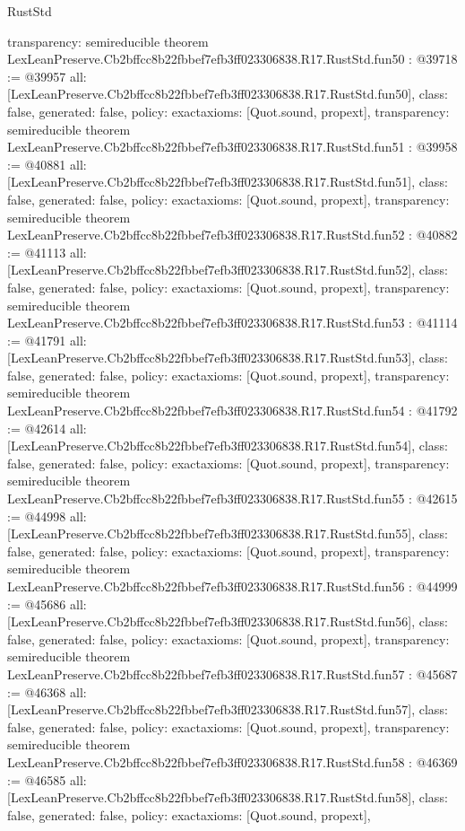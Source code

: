 \begin{lexlean}{RustStd}
\begin{coremodule}
{  transparency: semireducible
}
theorem LexLeanPreserve.Cb2bffcc8b22fbbef7efb3ff023306838.R17.RustStd.fun50 : @39718 := @39957 {
  all: [LexLeanPreserve.Cb2bffcc8b22fbbef7efb3ff023306838.R17.RustStd.fun50],
  class: false,
  generated: false,
  policy: exact{axioms: [Quot.sound, propext]},
  transparency: semireducible
}
theorem LexLeanPreserve.Cb2bffcc8b22fbbef7efb3ff023306838.R17.RustStd.fun51 : @39958 := @40881 {
  all: [LexLeanPreserve.Cb2bffcc8b22fbbef7efb3ff023306838.R17.RustStd.fun51],
  class: false,
  generated: false,
  policy: exact{axioms: [Quot.sound, propext]},
  transparency: semireducible
}
theorem LexLeanPreserve.Cb2bffcc8b22fbbef7efb3ff023306838.R17.RustStd.fun52 : @40882 := @41113 {
  all: [LexLeanPreserve.Cb2bffcc8b22fbbef7efb3ff023306838.R17.RustStd.fun52],
  class: false,
  generated: false,
  policy: exact{axioms: [Quot.sound, propext]},
  transparency: semireducible
}
theorem LexLeanPreserve.Cb2bffcc8b22fbbef7efb3ff023306838.R17.RustStd.fun53 : @41114 := @41791 {
  all: [LexLeanPreserve.Cb2bffcc8b22fbbef7efb3ff023306838.R17.RustStd.fun53],
  class: false,
  generated: false,
  policy: exact{axioms: [Quot.sound, propext]},
  transparency: semireducible
}
theorem LexLeanPreserve.Cb2bffcc8b22fbbef7efb3ff023306838.R17.RustStd.fun54 : @41792 := @42614 {
  all: [LexLeanPreserve.Cb2bffcc8b22fbbef7efb3ff023306838.R17.RustStd.fun54],
  class: false,
  generated: false,
  policy: exact{axioms: [Quot.sound, propext]},
  transparency: semireducible
}
theorem LexLeanPreserve.Cb2bffcc8b22fbbef7efb3ff023306838.R17.RustStd.fun55 : @42615 := @44998 {
  all: [LexLeanPreserve.Cb2bffcc8b22fbbef7efb3ff023306838.R17.RustStd.fun55],
  class: false,
  generated: false,
  policy: exact{axioms: [Quot.sound, propext]},
  transparency: semireducible
}
theorem LexLeanPreserve.Cb2bffcc8b22fbbef7efb3ff023306838.R17.RustStd.fun56 : @44999 := @45686 {
  all: [LexLeanPreserve.Cb2bffcc8b22fbbef7efb3ff023306838.R17.RustStd.fun56],
  class: false,
  generated: false,
  policy: exact{axioms: [Quot.sound, propext]},
  transparency: semireducible
}
theorem LexLeanPreserve.Cb2bffcc8b22fbbef7efb3ff023306838.R17.RustStd.fun57 : @45687 := @46368 {
  all: [LexLeanPreserve.Cb2bffcc8b22fbbef7efb3ff023306838.R17.RustStd.fun57],
  class: false,
  generated: false,
  policy: exact{axioms: [Quot.sound, propext]},
  transparency: semireducible
}
theorem LexLeanPreserve.Cb2bffcc8b22fbbef7efb3ff023306838.R17.RustStd.fun58 : @46369 := @46585 {
  all: [LexLeanPreserve.Cb2bffcc8b22fbbef7efb3ff023306838.R17.RustStd.fun58],
  class: false,
  generated: false,
  policy: exact{axioms: [Quot.sound, propext]},
}
\end{coremodule}
\end{lexlean}

